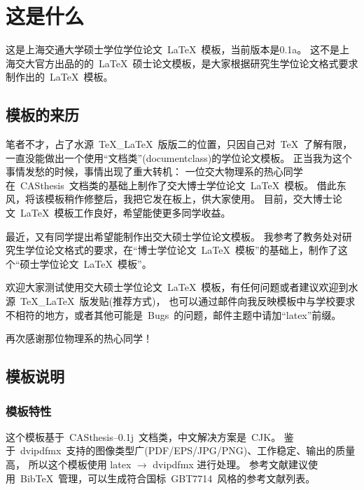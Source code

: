 \chapter{这是什么}
\label{chap:what}

这是上海交通大学硕士学位学位论文~\LaTeX~模板，当前版本是0.1a。
这不是上海交大官方出品的的~\LaTeX~硕士论文模板，是大家根据研究生学位论文格式要求制作出的~\LaTeX~模板。

\section{模板的来历}

笔者不才，占了水源~TeX\_LaTeX~版版二的位置，只因自己对~\TeX~了解有限，一直没能做出一个使用“文档类”(documentclass)的学位论文模板。
正当我为这个事情发愁的时候，事情出现了重大转机：
一位交大物理系的热心同学在~CASthesis~文档类的基础上制作了交大博士学位论文~\LaTeX~模板。
借此东风，将该模板稍作修整后，我把它发在板上，供大家使用。
目前，交大博士论文~\LaTeX~模板工作良好，希望能使更多同学收益。

最近，又有同学提出希望能制作出交大硕士学位论文模板。
我参考了教务处对研究生学位论文格式的要求，在``博士学位论文~\LaTeX~模板''的基础上，制作了这个``硕士学位论文~\LaTeX~模板''。

欢迎大家测试使用交大硕士学位论文~\LaTeX~模板，有任何问题或者建议欢迎到水源~TeX\_LaTeX~版发贴(推荐方式)，
也可以通过邮件向我反映模板中与学校要求不相符的地方，或者其他可能是~Bugs~的问题，邮件主题中请加``latex''前缀\footnotemark[1]。

再次感谢那位物理系的热心同学！

\section{模板说明}
\label{sec:fastguide}

\subsection{模板特性}
\label{sec:features}

这个模板基于~CASthesis--0.1j~文档类，中文解决方案是~CJK。
鉴于~dvipdfmx~支持的图像类型广(PDF/EPS/JPG/PNG)、工作稳定、输出的质量高，
所以这个模板使用 latex $\rightarrow$ dvipdfmx 进行处理。
参考文献建议使用~BibTeX~管理，可以生成符合国标~GBT7714~风格的参考文献列表。

